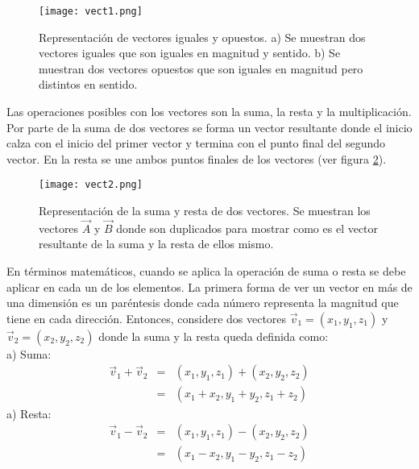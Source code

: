  \begin{center}
\begin{figure}[h!]
\centering
\texttt{[image: vect1.png]}
\caption[Representación 
Representación de vectores iguales y opuestos.]{Representación de vectores iguales y opuestos. a) Se muestran dos vectores iguales que son iguales en magnitud y sentido. b) Se muestran dos vectores opuestos que son iguales en magnitud pero distintos en sentido.} \label{vect1}
\end{figure}
\end{center}

Las operaciones posibles con los vectores son la suma, la resta y la multiplicación. Por parte de la suma de dos vectores se forma un vector resultante donde el inicio calza con el inicio del primer vector y termina con el punto final del segundo vector. En la resta se une ambos puntos finales de los vectores (ver figura \ref{vect2}).

 \begin{center}
\begin{figure}[h!]
\centering
\texttt{[image: vect2.png]}
\caption[Representación de la suma y resta de dos vectores.]{Representación de la suma y resta de dos vectores. Se muestran los vectores $\vec{A}$ y $\vec{B}$ donde son duplicados para mostrar como es el vector resultante de la suma y la resta de ellos mismo.} \label{vect2}
\end{figure}
\end{center}

En términos matemáticos, cuando se aplica la operación de suma o resta se debe aplicar en cada un de los elementos. La primera forma de ver un vector en más de una dimensión es un paréntesis donde cada número representa la magnitud que tiene en cada dirección. Entonces, considere dos vectores $\vec{v}_{1}=(x_{1},y_{1},z_{1})$ y $\vec{v}_{2}=(x_{2},y_{2},z_{2})$ donde la suma y la resta queda definida como:\\

\noindent a) Suma:\\
\begin{eqnarray}
\vec{v}_{1}+\vec{v}_{2}&=&(x_{1},y_{1},z_{1})+(x_{2},y_{2},z_{2})\\
&=&(x_{1}+x_{2},y_{1}+y_{2},z_{1}+z_{2})
\end{eqnarray}
\noindent a) Resta:\\
\begin{eqnarray}
\vec{v}_{1}-\vec{v}_{2}&=&(x_{1},y_{1},z_{1})-(x_{2},y_{2},z_{2})\\
&=&(x_{1}-x_{2},y_{1}-y_{2},z_{1}-z_{2})
\end{eqnarray}


